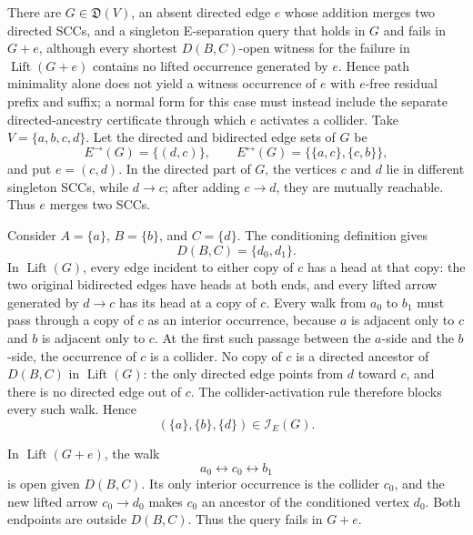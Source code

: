 There are \(G\in\mathfrak D(V)\), an absent directed edge \(e\) whose addition merges two directed SCCs, and a singleton E-separation query that holds in \(G\) and fails in \(G+e\), although every shortest \(D(B,C)\)-open witness for the failure in \(\operatorname{Lift}(G+e)\) contains no lifted occurrence generated by \(e\).  Hence path minimality alone does not yield a witness occurrence of \(e\) with \(e\)-free residual prefix and suffix; a normal form for this case must instead include the separate directed-ancestry certificate through which \(e\) activates a collider.
Take \(V=\{a,b,c,d\}\).  Let the directed and bidirected edge sets of \(G\) be
\[
 E^{\to}(G)=\{(d,c)\},
 \qquad
 E^{\leftrightarrow}(G)=\bigl\{\{a,c\},\{c,b\}\bigr\},
\]
and put \(e=(c,d)\).  In the directed part of \(G\), the vertices \(c\) and \(d\) lie in different singleton SCCs, while \(d\to c\); after adding \(c\to d\), they are mutually reachable.  Thus \(e\) merges two SCCs.

Consider \(A=\{a\}\), \(B=\{b\}\), and \(C=\{d\}\).  The conditioning definition gives
\[
 D(B,C)=\{d_0,d_1\}.
\]
In \(\operatorname{Lift}(G)\), every edge incident to either copy of \(c\) has a head at that copy: the two original bidirected edges have heads at both ends, and every lifted arrow generated by \(d\to c\) has its head at a copy of \(c\).  Every walk from \(a_0\) to \(b_1\) must pass through a copy of \(c\) as an interior occurrence, because \(a\) is adjacent only to \(c\) and \(b\) is adjacent only to \(c\).  At the first such passage between the \(a\)-side and the \(b\)-side, the occurrence of \(c\) is a collider.  No copy of \(c\) is a directed ancestor of \(D(B,C)\) in \(\operatorname{Lift}(G)\): the only directed edge points from \(d\) toward \(c\), and there is no directed edge out of \(c\).  The collider-activation rule therefore blocks every such walk.  Hence
\[
 (\{a\},\{b\},\{d\})\in\mathcal I_E(G).
\]

In \(\operatorname{Lift}(G+e)\), the walk
\[
 a_0\leftrightarrow c_0\leftrightarrow b_1
\]
is open given \(D(B,C)\).  Its only interior occurrence is the collider \(c_0\), and the new lifted arrow \(c_0\to d_0\) makes \(c_0\) an ancestor of the conditioned vertex \(d_0\).  Both endpoints are outside \(D(B,C)\).  Thus the query fails in \(G+e\).

